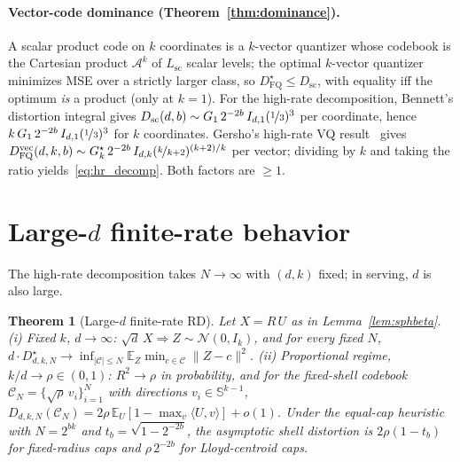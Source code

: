 \documentclass{article}
\newtheorem{theorem}{Theorem}
\theoremstyle{definition}
\theoremstyle{remark}
\newcommand{\bbS}{\mathbb{S}}
\begin{document}
\paragraph{Vector-code dominance (Theorem~\ref{thm:dominance}).}
A scalar product code on $k$ coordinates is a $k$-vector quantizer
whose codebook is the Cartesian product $\mathcal{A}^k$ of
$L_{\mathrm{sc}}$ scalar levels; the optimal $k$-vector quantizer
minimizes MSE over a strictly larger class, so
$D^\star_{\mathrm{FQ}} \leq D_{\mathrm{sc}}$, with equality iff the
optimum \emph{is} a product (only at $k = 1$).  For the high-rate
decomposition, Bennett's distortion integral gives
$D_{\mathrm{sc}}(d, b) \sim G_1\, 2^{-2b}\, I_{d, 1}(\nicefrac{1}{3})^3$
per coordinate, hence $k\,G_1\, 2^{-2b}\,
I_{d, 1}(\nicefrac{1}{3})^3$ for $k$ coordinates.  Gersho's
high-rate VQ result~\citep{gersho1979asymptotic} gives
$D^{\mathrm{vec}}_{\mathrm{FQ}}(d, k, b) \sim G_k^\star\, 2^{-2b}\,
I_{d, k}(\nicefrac{k}{k + 2})^{(k + 2)/k}$ per vector; dividing by
$k$ and taking the ratio yields~\eqref{eq:hr_decomp}.  Both factors
are $\geq 1$.

\section{Large-\texorpdfstring{$d$}{d} finite-rate behavior}
\label{app:large_d_RD}

The high-rate decomposition takes $N \to \infty$ with $(d, k)$
fixed; in serving, $d$ is also large.

\begin{theorem}[Large-$d$ finite-rate RD]
\label{thm:large_d}
Let $X = R\,U$ as in Lemma~\ref{lem:sphbeta}.  (i) Fixed $k$,
$d \to \infty$: $\sqrt d\, X \Rightarrow Z \sim \mathcal{N}(0, I_k)$,
and for every fixed $N$,
$d \cdot D^\star_{d, k, N} \to
\inf_{|\mathcal{C}| \leq N} \mathbb{E}_Z \min_{c \in \mathcal{C}} \|Z - c\|^2$.
(ii) Proportional regime, $k/d \to \rho \in (0, 1)$: $R^2 \to \rho$
in probability, and for the fixed-shell codebook
$\mathcal{C}_N = \{\sqrt\rho\, v_i\}_{i = 1}^{N}$ with directions
$v_i \in \bbS^{k - 1}$, $D_{d, k, N}(\mathcal{C}_N)
= 2\rho\,\mathbb{E}_U\!\left[1 - \max_v \langle U, v\rangle\right]
+ o(1)$.  Under the equal-cap heuristic with $N = 2^{bk}$ and
$t_b = \sqrt{1 - 2^{-2b}}$, the asymptotic shell distortion is
$2\rho(1 - t_b)$ for fixed-radius caps and $\rho\, 2^{-2b}$ for
Lloyd-centroid caps.
\end{theorem}
\end{document}
